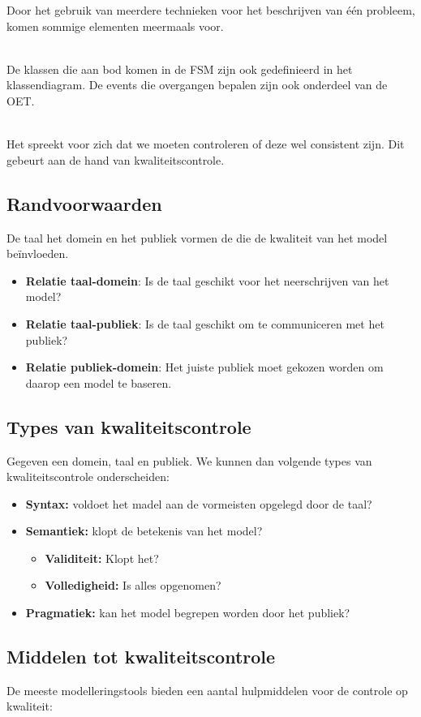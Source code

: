 \documentclass[../../main.tex]{subfiles}
\begin{document}
Door het gebruik van meerdere technieken voor het beschrijven van \'e\'en probleem, komen sommige elementen meermaals voor.\\
\\
\begin{ex}{ }
De klassen die aan bod komen in de FSM zijn ook gedefinieerd in het klassendiagram. De events die overgangen bepalen zijn ook onderdeel van de OET.
\end{ex}
\\
Het spreekt voor zich dat we moeten controleren of deze wel consistent zijn. Dit gebeurt aan de hand van kwaliteitscontrole.

\subsection{Randvoorwaarden}
De taal het domein en het publiek vormen de  die de kwaliteit van het model be\"invloeden.
\begin{itemize}
	\item \textbf{Relatie taal-domein}: Is de taal geschikt voor het neerschrijven van het model?
	\item \textbf{Relatie taal-publiek}: Is de taal geschikt om te communiceren met het publiek?
	\item \textbf{Relatie publiek-domein}: Het juiste publiek moet gekozen worden om daarop een model te baseren.
\end{itemize}
\subsection{Types van kwaliteitscontrole}
Gegeven een domein, taal en publiek. We kunnen dan volgende types van kwaliteitscontrole onderscheiden:
\begin{itemize}
	\item \textbf{Syntax:} voldoet het madel aan de vormeisten opgelegd door de taal?
	\item \textbf{Semantiek:} klopt de betekenis van het model?
	\begin{itemize}
		\item \textbf{Validiteit:} Klopt het?
		\item \textbf{Volledigheid:} Is alles opgenomen?
	\end{itemize}
	\item \textbf{Pragmatiek:} kan het model begrepen worden door het publiek?
\end{itemize}
\subsection{Middelen tot kwaliteitscontrole}
De meeste modelleringstools bieden een aantal hulpmiddelen voor de controle op kwaliteit:
\end{document}
